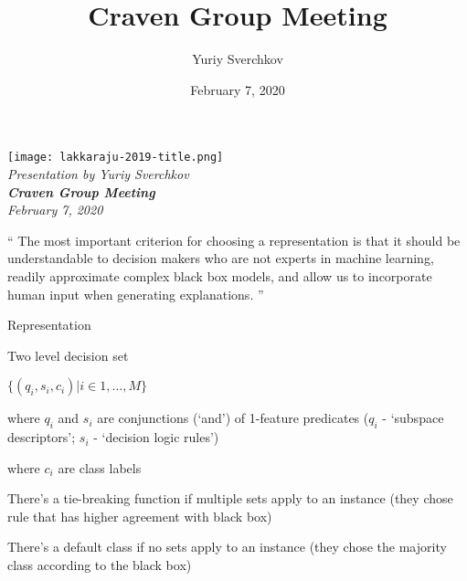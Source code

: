 \documentclass[aspectratio=169]{beamer}
\title{Craven Group Meeting}
\author{Yuriy Sverchkov}
\institute{University of Wisconsin--Madison}
\date{February 7, 2020}
\begin{document}
	
	\begin{frame}[plain]
		\raggedleft
		\texttt{[image: lakkaraju-2019-title.png]} \\
		\vfill
		\it Presentation by Yuriy Sverchkov \\
		\textbf{Craven Group Meeting} \\ February 7, 2020
	\end{frame}

	
	
	\begin{frame}
		`` The most important criterion for choosing a representation is that it
		should be understandable to decision makers who are not experts in
		machine learning, readily approximate complex black box models,
		and allow us to incorporate human input when generating explanations. ''
	\end{frame}

	\begin{frame}{Representation}
		
		Two level decision set
		
		$\{ (q_i, s_i, c_i) | i \in 1, \ldots, M \}$
		
		where $q_i$ and $s_i$ are conjunctions (`and') of 1-feature predicates
		($q_i$ - `subspace descriptors'; $s_i$ - `decision logic rules')
		
		where $c_i$ are class labels
		
		There's a tie-breaking function if multiple sets apply to an instance (they chose rule that has higher agreement with black box) %
		
		There's a default class if no sets apply to an instance (they chose the majority class according to the black box) %
		
	\end{frame}

\end{document}

